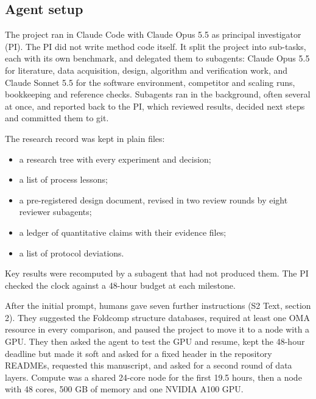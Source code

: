 \subsection*{Agent setup}
The project ran in Claude Code with Claude Opus 5.5 as principal investigator (PI). The PI did not write method code itself. It split the project into sub-tasks, each with its own benchmark, and delegated them to subagents: Claude Opus 5.5 for literature, data acquisition, design, algorithm and verification work, and Claude Sonnet 5.5 for the software environment, competitor and scaling runs, bookkeeping and reference checks. Subagents ran in the background, often several at once, and reported back to the PI, which reviewed results, decided next steps and committed them to git.

The research record was kept in plain files:
\begin{itemize}
\item a research tree with every experiment and decision;
\item a list of process lessons;
\item a pre-registered design document, revised in two review rounds by eight reviewer subagents;
\item a ledger of quantitative claims with their evidence files;
\item a list of protocol deviations.
\end{itemize}
Key results were recomputed by a subagent that had not produced them. The PI checked the clock against a 48-hour budget at each milestone.

After the initial prompt, humans gave seven further instructions (S2 Text, section 2). They suggested the Foldcomp structure databases, required at least one OMA resource in every comparison, and paused the project to move it to a node with a GPU. They then asked the agent to test the GPU and resume, kept the 48-hour deadline but made it soft and asked for a fixed header in the repository READMEs, requested this manuscript, and asked for a second round of data layers. Compute was a shared 24-core node for the first 19.5 hours, then a node with 48 cores, 500 GB of memory and one NVIDIA A100 GPU.

